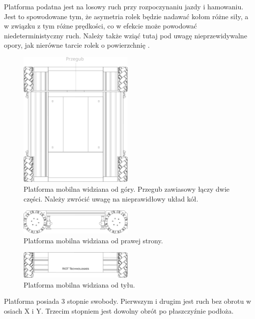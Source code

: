 Platforma podatna jest na losowy ruch przy rozpoczynaniu jazdy i hamowaniu.
Jest to spowodowane tym, że asymetria rolek będzie nadawać kołom różne siły, a w związku z tym różne prędkości, co w efekcie może powodować niedeterministyczny ruch.
Należy także wziąć tutaj pod uwagę nieprzewidywalne opory, jak nierówne tarcie rolek o powierzchnię \cite{braking}.

\begin{figure}[H]
\centering
 \includegraphics[width=0.5\textwidth]{graphics/base_top.pdf}
\caption{Platforma mobilna widziana od góry. Przegub zawiasowy łączy dwie części. Należy zwrócić uwagę na nieprawidłowy układ kół.}
\end{figure} 

\begin{figure}[H]
\centering
 \includegraphics[width=0.5\textwidth]{graphics/base_side.pdf}
\caption{Platforma mobilna widziana od prawej strony.}
\end{figure} 

\begin{figure}[H]
\centering
 \includegraphics[width=0.5\textwidth]{graphics/base_front.pdf}
\caption{Platforma mobilna widziana od tyłu.}
\end{figure} 

Platforma posiada 3 stopnie swobody. Pierwszym i drugim jest ruch bez obrotu w osiach X i Y.
Trzecim stopniem jest dowolny obrót po płaszczyźnie podłoża.

